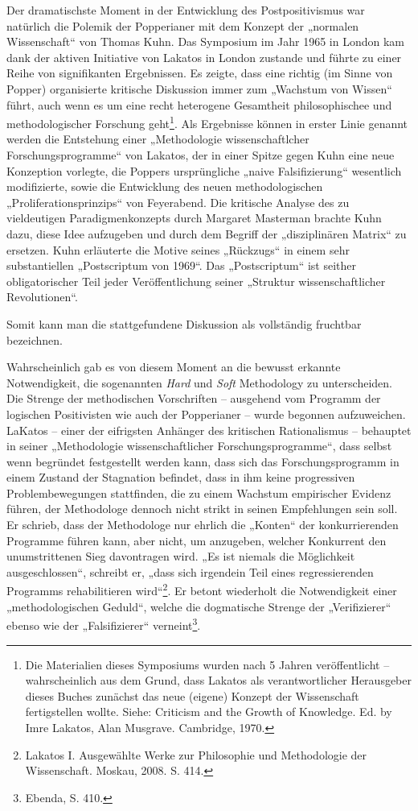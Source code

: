 \documentclass[11pt,a4paper]{article}
\begin{document}
Der dramatischste Moment in der Entwicklung des Postpositivismus war natürlich
die Polemik der Popperianer mit dem Konzept der „normalen Wissenschaft“ von
Thomas Kuhn.  Das Symposium im Jahr 1965 in London kam dank der aktiven
Initiative von Lakatos in London zustande und führte zu einer Reihe von
signifikanten Ergebnissen. Es zeigte, dass eine richtig (im Sinne von Popper)
organisierte kritische Diskussion immer zum „Wachstum von Wissen“ führt, auch
wenn es um eine recht heterogene Gesamtheit philosophischee und
methodologischer Forschung geht\footnote{Die Materialien dieses Symposiums
  wurden nach 5 Jahren veröffentlicht -- wahrscheinlich aus dem Grund, dass
  Lakatos als verantwortlicher Herausgeber dieses Buches zunächst das neue
  (eigene) Konzept der Wissenschaft fertigstellen wollte.  Siehe: Criticism
  and the Growth of Knowledge. Ed. by Imre Lakatos, Alan Musgrave. Cambridge,
  1970.}. Als Ergebnisse können in erster Linie genannt werden die Entstehung
einer „Methodologie wissenschaftlcher Forschungsprogramme“ von Lakatos, der in
einer Spitze gegen Kuhn eine neue Konzeption vorlegte, die Poppers
ursprüngliche „naive Falsifizierung“ wesentlich modifizierte, sowie die
Entwicklung des neuen methodologischen „Proliferationsprinzips“ von
Feyerabend.  Die kritische Analyse des zu vieldeutigen Paradigmenkonzepts
durch Margaret Masterman brachte Kuhn dazu, diese Idee aufzugeben und durch
dem Begriff der „disziplinären Matrix“ zu ersetzen. Kuhn erläuterte die Motive
seines „Rückzugs“ in einem sehr substantiellen „Postscriptum von 1969“.  Das
„Postscriptum“ ist seither obligatorischer Teil jeder Veröffentlichung seiner
„Struktur wissenschaftlicher Revolutionen“.

Somit kann man die stattgefundene Diskussion als vollständig fruchtbar
bezeichnen.

Wahrscheinlich gab es von diesem Moment an die bewusst erkannte Notwendigkeit,
die sogenannten \emph{Hard} und \emph{Soft} Methodology zu unterscheiden.  Die
Strenge der methodischen Vorschriften -- ausgehend vom Programm der logischen
Positivisten wie auch der Popperianer -- wurde begonnen aufzuweichen. LaKatos
-- einer der eifrigsten Anhänger des kritischen Rationalismus -- behauptet in
seiner „Methodologie wissenschaftlicher Forschungsprogramme“, dass selbst wenn
begründet festgestellt werden kann, dass sich das Forschungsprogramm in einem
Zustand der Stagnation befindet, dass in ihm keine progressiven
Problembewegungen stattfinden, die zu einem Wachstum empirischer Evidenz
führen, der Methodologe dennoch nicht strikt in seinen Empfehlungen sein soll.
Er schrieb, dass der Methodologe nur ehrlich die „Konten“ der konkurrierenden
Programme führen kann, aber nicht, um anzugeben, welcher Konkurrent den
unumstrittenen Sieg davontragen wird. „Es ist niemals die Möglichkeit
ausgeschlossen“, schreibt er, „dass sich irgendein Teil eines regressierenden
Programms rehabilitieren wird“\footnote{Lakatos I. Ausgewählte Werke zur
  Philosophie und Methodologie der Wissenschaft. Moskau, 2008. S. 414.}. Er
betont wiederholt die Notwendigkeit einer „methodologischen Geduld“, welche
die dogmatische Strenge der „Verifizierer“ ebenso wie der „Falsifizierer“
verneint\footnote{Ebenda, S. 410.}. 
\end{document}
